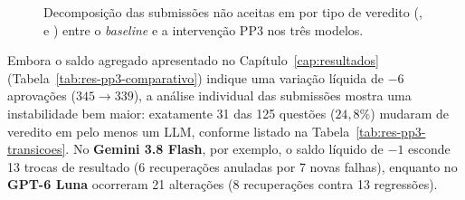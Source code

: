\begin{figure}[!htbp]
\centering

\caption[Distribuição de erros em C no Baseline versus PP3]{Decomposição das submissões não aceitas em  por tipo de veredito (,  e ) entre o \textit{baseline} e a intervenção PP3 nos três modelos.}
\label{fig:res-pp3-erros}
\end{figure}
\FloatBarrier

Embora o saldo agregado apresentado no Capítulo~\ref{cap:resultados} (Tabela~\ref{tab:res-pp3-comparativo}) indique uma variação líquida de $-6$ aprovações ($345 \rightarrow 339$), a análise individual das submissões mostra uma instabilidade bem maior: exatamente 31 das 125 questões ($24{,}8\%$) mudaram de veredito em pelo menos um LLM, conforme listado na Tabela~\ref{tab:res-pp3-transicoes}. No \textbf{Gemini 3.8 Flash}, por exemplo, o saldo líquido de $-1$  esconde 13 trocas de resultado (6 recuperações anuladas por 7 novas falhas), enquanto no \textbf{GPT-6 Luna} ocorreram 21 alterações (8 recuperações contra 13 regressões).

